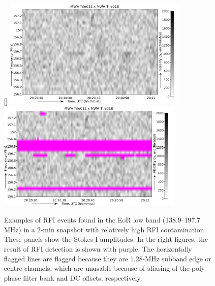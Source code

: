 \documentclass[useAMS,usenatbib]{mn2e}
\begin{document}
\begin{figure}
{\label{fig:150_2}
}\\\vspace{3mm}%
[\linewidth]{%
\includegraphics[width=9.1cm]{img/156_7_mhz_example}\includegraphics[width=9.1cm]{img/156_7_mhz_flagged}
\label{fig:156_7}
}%
\caption{Examples of RFI events found in the EoR low band (138.9--197.7 MHz) in a 2-min snapshot with relatively high RFI contamination. These panels show the Stokes I amplitudes. In the right figures, the result of RFI detection is shown with purple. The horizontally flagged lines are flagged because they are 1.28-MHz subband edge or centre channels, which are unusable because of aliasing of the poly-phase filter bank and DC offsets, respectively.}
\end{figure}
\end{document}
